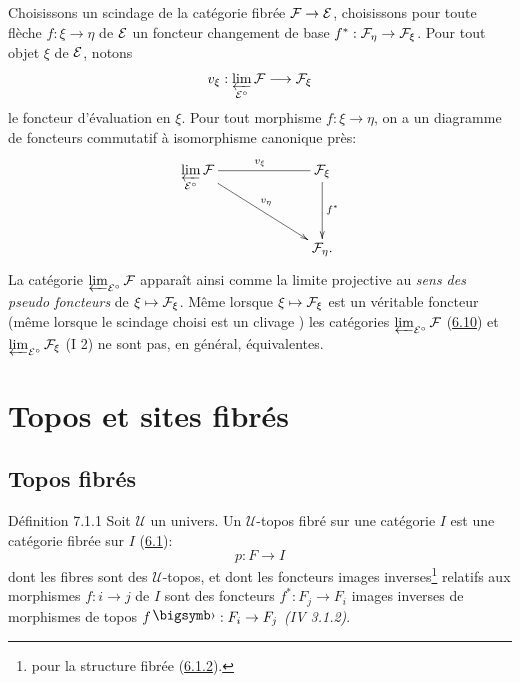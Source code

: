 \documentclass[10pt]{../fichiers-configuration-latex/smfart}
\begin{document}
\subsection{}

Choisissons un scindage de la catégorie fibrée $\Ff \to
\Ee$, \ie choisissons pour toute flèche $f : \xi \to \eta$ de
${\mathcal E}$ un foncteur changement de base $f^{\ast} :
\Ff_{\eta} \to \Ff_{\xi}$. Pour tout objet $\xi$ de
${\mathcal E}$, notons
$$
v_{\xi} : \varprojlim_{\Ee^{\circ}} \Ff \to \Ff_{\xi}
$$
le foncteur d'évaluation en $\xi$. Pour tout morphisme $f : \xi \to
\eta$, on a un diagramme de foncteurs commutatif à isomorphisme
canonique près:
\[
\xymatrix@C=2.25cm@R=1.25cm{
\displaystyle\mathop{\varprojlim}_{\Ee^{\circ}} \Ff
\ar@{-}[r]^{v_{\xi}} \ar[rd]^{v_\eta}& \Ff_{\xi} \ar[d]^{f^\ast}\\
                                 & \Ff_\eta.
}
\]
La catégorie $\varprojlim_{{\mathcal E}^{\circ}}
{\mathcal F}$ apparaît ainsi comme la limite projective au \emph{sens
  des pseudo foncteurs} de $\xi \mapsto {\mathcal F}_{\xi}$. Même lorsque
$\xi \mapsto {\mathcal F}_{\xi}$ est un véritable foncteur (\ie même
lorsque le scindage choisi est un clivage \cite{SGA4-06:5}) les catégories
$\varprojlim_{{\mathcal E}^{\circ}}{\mathcal F}$
(\hyperref[VI.subsec6.10]{6.10}) et
$\varprojlim_{{\mathcal E}^{\circ}}{\mathcal F}_{\xi}$
(I 2) ne sont pas, en général, équivalentes.

\section{Topos et sites fibrés}

\subsection{Topos fibrés}

\begin{enonce*}{Définition 7.1.1}
Soit $𝒰$ un univers. Un $𝒰$-topos fibré sur une
catégorie $I$ est une catégorie fibrée sur $I$ (\hyperref[VI.def6.1]{6.1}):
$$
p : F \to I
$$
dont les fibres sont des $𝒰$-topos, et dont les foncteurs images
inverses\footnote{pour la structure fibrée (\hyperref[VI.subsubsec6.1.2]{6.1.2}).} relatifs aux
morphismes $f : i \to j$ de $I$ sont des foncteurs $f^{\ast} : F_j \to
F_i$ images inverses de morphismes de topos $f\bigdot : F_i \to F_j$
\emph{(IV 3.1.2)}.
\end{enonce*}

\setcounter{subsubsection}{1}
\end{document}
